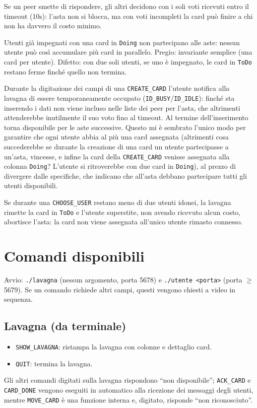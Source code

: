 \documentclass[10pt,a4paper, titlepage]{article}
\begin{document}
Se un peer smette di rispondere, gli altri decidono con i soli voti ricevuti entro il timeout (10s): l'asta non si blocca, ma con voti incompleti la card può finire a chi non ha davvero il costo minimo.

Utenti già impegnati con una card in \texttt{Doing} non partecipano alle aste: nessun utente può così accumulare più card in parallelo. Pregio: invariante semplice (una card per utente). Difetto: con due soli utenti, se uno è impegnato, le card in \texttt{ToDo} restano ferme finché quello non termina.

Durante la digitazione dei campi di una \texttt{CREATE\_CARD} l'utente notifica alla lavagna di essere temporaneamente occupato (\texttt{ID\_BUSY}/\texttt{ID\_IDLE}): finché sta inserendo i dati non viene incluso nelle liste dei peer per l'asta, che altrimenti attenderebbe inutilmente il suo voto fino al timeout. Al termine dell'inserimento torna disponibile per le aste successive.
Questo mi è sembrato l'unico modo per garantire che ogni utente abbia al più una card assegnata (altrimenti cosa succederebbe se durante la creazione di una card un utente partecipasse a un'asta, vincesse, e infine la card della \texttt{CREATE\_CARD} venisse assegnata alla colonna \texttt{Doing}? L'utente si ritroverebbe con due card in \texttt{Doing}), al prezzo di divergere dalle specifiche, che indicano che all'asta debbano partecipare tutti gli utenti disponibili.

Se durante una \texttt{CHOOSE\_USER} restano meno di due utenti idonei, la lavagna rimette la card in \texttt{ToDo} e l'utente superstite, non avendo ricevuto alcun costo, abortisce l'asta: la card non viene assegnata all'unico utente rimasto connesso.

\section*{Comandi disponibili}
Avvio: \texttt{./lavagna} (nessun argomento, porta 5678) e \texttt{./utente <porta>} (porta $\geq$ 5679).
Se un comando richiede altri campi, questi vengono chiesti a video in sequenza.
\subsection*{Lavagna (da terminale)}
\begin{itemize}\setlength{\itemsep}{1pt}\setlength{\parsep}{0pt}
    \item \texttt{SHOW\_LAVAGNA}: ristampa la lavagna con colonne e dettaglio card.
    \item \texttt{QUIT}: termina la lavagna.
\end{itemize}
Gli altri comandi digitati sulla lavagna rispondono ``non disponibile''; \texttt{ACK\_CARD} e \texttt{CARD\_DONE} vengono eseguiti in automatico alla ricezione dei messaggi degli utenti, mentre \texttt{MOVE\_CARD} è una funzione interna e, digitato, risponde ``non riconosciuto''.
\end{document}
